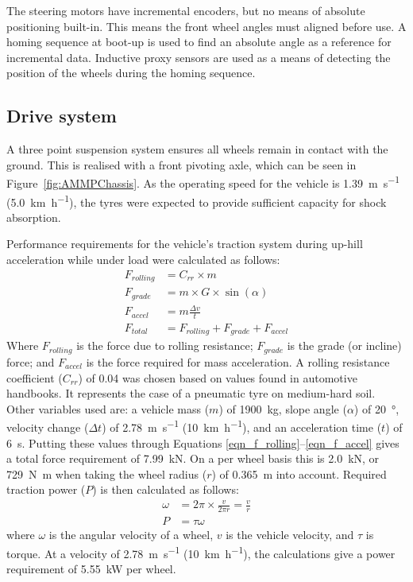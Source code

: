 \documentclass[preprint,authoryear,12pt]{elsarticle}
\begin{document}
        The steering motors have incremental encoders, but no means of absolute positioning built-in.
        This means the front wheel angles must aligned before use.
        A homing sequence at boot-up is used to find an absolute angle as a reference for incremental data.
        Inductive proxy sensors are used as a means of detecting the position of the wheels during the homing sequence.

    \subsection{Drive system}
    \label{sub:drive}

        A three point suspension system ensures all wheels remain in contact with the ground.
        This is realised with a front pivoting axle, which can be seen in  Figure~\ref{fig:AMMPChassis}.
        As the operating speed for the vehicle is \SI{1.39}{\meter\per\second} (\SI{5.0}{\kilo\meter\per\hour}), the tyres were expected to provide sufficient capacity for shock absorption.

        Performance requirements for the vehicle's traction system during up-hill acceleration while under load were calculated as follows:
        \begin{align}
        \label{eqn_f_rolling}
        F_{rolling} &= C_{rr} \times m\\
        F_{grade} &= m \times G \times \sin(\alpha)\\
        F_{accel} &= m \frac{\Delta v}{t}\\
        \label{eqn_f_accel}
        F_{total} &= F_{rolling} + F_{grade} + F_{accel}
        \end{align}
        Where $F_{rolling}$ is the force due to rolling resistance; $F_{grade}$ is the grade (or incline) force; and $F_{accel}$ is the force required for mass acceleration.
        A rolling resistance coefficient ($C_{rr}$) of 0.04 was chosen based on values found in automotive handbooks.
        It represents the case of a pneumatic tyre on medium-hard soil.
        Other variables used are: a vehicle mass ($m$) of \SI{1900}{\kilo\gram}, slope angle ($\alpha$) of \SI{20}{\degree}, velocity change ($\Delta t$) of \SI{2.78}{\metre\per\second} (\SI{10}{\kilo\meter\per\hour}), and an acceleration time ($t$) of \SI{6}{\second}.
        Putting these values through Equations \ref{eqn_f_rolling}--\ref{eqn_f_accel} gives a total force requirement of \SI{7.99}{\kilo\newton}.
        On a per wheel basis this is \SI{2.0}{\kilo\newton}, or \SI{729}{\newton\meter} when taking the wheel radius ($r$) of \SI{0.365}{\meter} into account.
        Required traction power ($P$) is then calculated as follows:
        \begin{align}
        \label{eqn_f_power}
        \omega &= 2 \pi \times \frac{v}{2 \pi r} = \frac{v}{r}\\
        P &= \tau \omega
        \end{align}
        where $\omega$ is the angular velocity of a wheel, $v$ is the vehicle velocity, and $\tau$ is torque.
        At a velocity of \SI{2.78}{\meter\per\second} (\SI{10}{\kilo\meter\per\hour}), the calculations give a power requirement of \SI{5.55}{\kilo\watt} per wheel.
\end{document}
